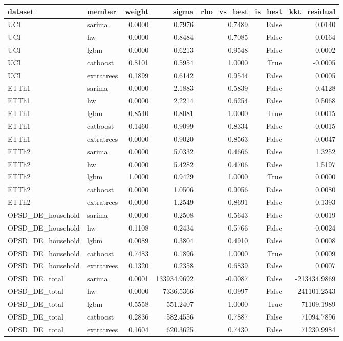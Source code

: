 \begin{tabular}{llrrrrr}
\toprule
dataset & member & weight & sigma & rho_vs_best & is_best & kkt_residual \\
\midrule
UCI & sarima & 0.0000 & 0.7976 & 0.7489 & False & 0.0140 \\
UCI & hw & 0.0000 & 0.8484 & 0.7085 & False & 0.0164 \\
UCI & lgbm & 0.0000 & 0.6213 & 0.9548 & False & 0.0002 \\
UCI & catboost & 0.8101 & 0.5954 & 1.0000 & True & -0.0005 \\
UCI & extratrees & 0.1899 & 0.6142 & 0.9544 & False & 0.0005 \\
ETTh1 & sarima & 0.0000 & 2.1883 & 0.5839 & False & 0.4128 \\
ETTh1 & hw & 0.0000 & 2.2214 & 0.6254 & False & 0.5068 \\
ETTh1 & lgbm & 0.8540 & 0.8081 & 1.0000 & True & 0.0015 \\
ETTh1 & catboost & 0.1460 & 0.9099 & 0.8334 & False & -0.0015 \\
ETTh1 & extratrees & 0.0000 & 0.9020 & 0.8563 & False & -0.0047 \\
ETTh2 & sarima & 0.0000 & 5.0332 & 0.4666 & False & 1.3252 \\
ETTh2 & hw & 0.0000 & 5.4282 & 0.4706 & False & 1.5197 \\
ETTh2 & lgbm & 1.0000 & 0.9429 & 1.0000 & True & 0.0000 \\
ETTh2 & catboost & 0.0000 & 1.0506 & 0.9056 & False & 0.0080 \\
ETTh2 & extratrees & 0.0000 & 1.2549 & 0.8691 & False & 0.1393 \\
OPSD_DE_household & sarima & 0.0000 & 0.2508 & 0.5643 & False & -0.0019 \\
OPSD_DE_household & hw & 0.1108 & 0.2434 & 0.5766 & False & -0.0024 \\
OPSD_DE_household & lgbm & 0.0089 & 0.3804 & 0.4910 & False & 0.0008 \\
OPSD_DE_household & catboost & 0.7483 & 0.1896 & 1.0000 & True & 0.0009 \\
OPSD_DE_household & extratrees & 0.1320 & 0.2358 & 0.6839 & False & 0.0007 \\
OPSD_DE_total & sarima & 0.0001 & 133934.9692 & -0.0087 & False & -213434.9869 \\
OPSD_DE_total & hw & 0.0000 & 7336.5366 & 0.0997 & False & 241101.2543 \\
OPSD_DE_total & lgbm & 0.5558 & 551.2407 & 1.0000 & True & 71109.1989 \\
OPSD_DE_total & catboost & 0.2836 & 582.4556 & 0.7887 & False & 71094.7896 \\
OPSD_DE_total & extratrees & 0.1604 & 620.3625 & 0.7430 & False & 71230.9984 \\
\bottomrule
\end{tabular}
